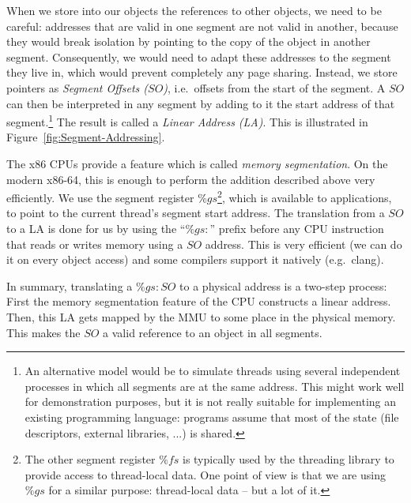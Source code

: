\documentclass{sigplanconf}
\begin{document}
When we store into our objects the references to other objects, we
need to be careful: addresses that are valid in one segment are not
valid in another, because they would break isolation by pointing to
the copy of the object in another segment.  Consequently, we would
need to adapt these addresses to the segment they live in, which would
prevent completely any page sharing.  Instead, we store pointers as
\emph{Segment Offsets ($SO$)}, i.e.\ offsets from the start of the
segment.  A $SO$ can then be interpreted in any segment by adding to
it the start address of that segment.\footnote{An alternative model
would be to simulate threads using several independent processes in
which all segments are at the same address.  This might work well for
demonstration purposes, but it is not really suitable for implementing
an existing programming language: programs assume that most of the
state (file descriptors, external libraries, ...) is shared.} The
result is called a \emph{Linear Address (LA)}. This is illustrated in
Figure~\ref{fig:Segment-Addressing}.

The x86 CPUs provide a feature which is called \emph{memory
segmentation}.  On the modern x86-64, this is enough to perform the
addition described above very efficiently.  We use the segment
register $\%gs$\footnote{The other segment register $\%fs$ is
typically used by the threading library to provide access to
thread-local data.  One point of view is that we are using $\%gs$ for
a similar purpose: thread-local data -- but a lot of it.}, which is
available to applications, to point to the current thread's segment
start address.  The translation from a $SO$ to a LA is done for us by
using the ``$\%gs\colon$'' prefix before any CPU instruction that
reads or writes memory using a $SO$ address.  This is very efficient
(we can do it on every object access) and some compilers support it
natively (e.g.\ clang).

In summary, translating a $\%gs:SO$ to a physical address is a
two-step process: First the memory segmentation feature of the CPU
constructs a linear address. Then, this LA gets mapped by the MMU to
some place in the physical memory. This makes the $SO$ a valid reference
to an object in all segments.


\end{document}
